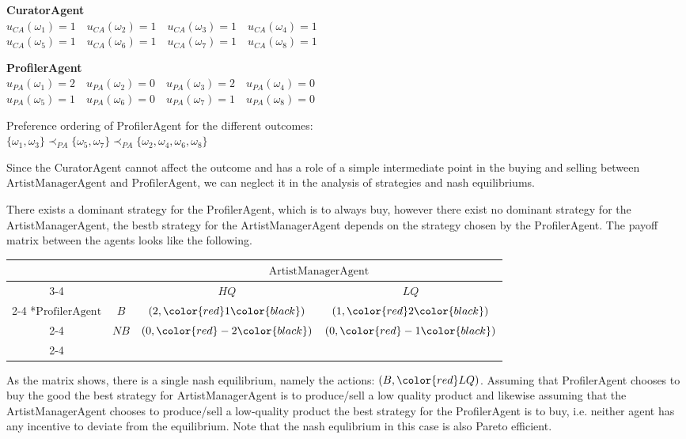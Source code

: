 \documentclass[a4paper, 11pt]{article}
\begin{document}
\begin{description}
\textbf{CuratorAgent}\\
$u_{CA}(\omega_1) = 1 \quad u_{CA}(\omega_2) = 1 \quad u_{CA}(\omega_3) = 1 \quad u_{CA}(\omega_4) = 1$ \\
$u_{CA}(\omega_5) = 1 \quad u_{CA}(\omega_6) = 1 \quad u_{CA}(\omega_7) = 1 \quad u_{CA}(\omega_8) = 1$

\textbf{ProfilerAgent}\\
$u_{PA}(\omega_1) = 2 \quad u_{PA}(\omega_2) = 0 \quad u_{PA}(\omega_3) = 2 \quad u_{PA}(\omega_4) = 0$ \\
$u_{PA}(\omega_5) = 1 \quad u_{PA}(\omega_6) = 0 \quad u_{PA}(\omega_7) = 1 \quad u_{PA}(\omega_8) = 0$

Preference ordering of ProfilerAgent for the different outcomes:\\
$\{\omega_1, \omega_3\} \prec_{PA} \{\omega_5, \omega_7\} \prec_{PA} \{\omega_2, \omega_4, \omega_6, \omega_8\}$

Since the CuratorAgent cannot affect the outcome and has a role of a simple intermediate point in the buying and selling between $\text{ArtistManagerAgent}$ and $\text{ProfilerAgent}$, we can neglect it in the analysis of strategies and nash equilibriums.

There exists a dominant strategy for the ProfilerAgent, which is to always buy, however there exist no dominant strategy for the ArtistManagerAgent, the bestb strategy for the ArtistManagerAgent depends on the strategy chosen by the ProfilerAgent. The payoff matrix between the agents looks like the following.

\end{description}

 \begin{table}[H]
    \setlength{\extrarowheight}{2pt}
    \begin{tabular}{*{4}{c|}}
      \multicolumn{2}{c}{} & \multicolumn{2}{c}{\color{red}$\text{ArtistManagerAgent}$}\\\cline{3-4}
      \multicolumn{1}{c}{} &  & $HQ$  & $LQ$ \\\cline{2-4}
      \multirow{2}*{$\text{ProfilerAgent}$}  & $B$ & $(2,\color{red}1\color{black})$ & $(1,\color{red}2\color{black})$ \\\cline{2-4}
      & $NB$ & $(0,\color{red}-2\color{black})$ & $(0,\color{red}-1\color{black})$ \\\cline{2-4}
    \end{tabular}
  \end{table}

As the matrix shows, there is a single nash equilibrium, namely the actions: $(B, \color{red}LQ)$. Assuming that ProfilerAgent chooses to buy the good the best strategy for ArtistManagerAgent is to produce/sell a low quality product and likewise assuming that the ArtistManagerAgent chooses to produce/sell a low-quality product the best strategy for the ProfilerAgent is to buy, i.e. neither agent has any incentive to deviate from the equilibrium. Note that the nash equlibrium in this case is also Pareto efficient.
\end{document}
